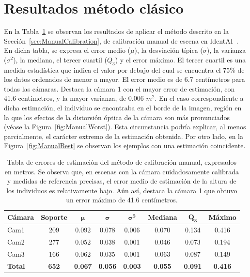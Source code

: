 \section{Resultados método clásico}
En la Tabla~\ref{tab:ManualResults} se observan los resultados de
aplicar el método descrito en la Sección~\ref{sec:ManualCalibration},
de calibración manual de escena en IdentAI~\cite{panacea2026}.
En dicha tabla, se expresa el error medio ($\mu$), la desviación típica ($\sigma$), la varianza ($\sigma^2$), la mediana,
el tercer cuartil ($Q_3$) y el error máximo. El tercer cuartil es una medida estadística que indica el valor
por debajo del cual se encuentra el 75\% de los datos ordenados de menor a mayor.
El error medio es de 6.7 centímetros para todas las cámaras.
Destaca la cámara 1 con el mayor error de estimación, con 41.6 centímetros,
y la mayor varianza, de 0.006 $m^2$. En el caso correspondiente a dicha estimación,
el individuo se encontraba en el borde de la imagen, región en la que los efectos
de la distorsión óptica de la cámara son más pronunciados (véase la Figura~\ref{fig:ManualWorst}).
Esta circunstancia podría explicar, al menos parcialmente, el carácter extremo de la estimación obtenida.
Por otro lado, en la Figura~\ref{fig:ManualBest} se observan los ejemplos
con una estimación coincidente.
\begin{table}[!ht]
  \centering
  \scriptsize
\begin{tabular}{|l|c|c|c|c|c|c|c|}
\hline
\rowcolor[HTML]{FFCB2F}
\textbf{Cámara} & \textbf{Soporte} & $\bm{\mu}$ & $\bm{\sigma}$ & $\bm{\sigma^2}$ & \textbf{Mediana} & $\bm{Q_3}$ & \textbf{Máximo} \\
\hline
Cam1 & 209 & 0.092 & 0.078 & 0.006 &0.070 & 0.134 & 0.416 \\
\hline
Cam2 & 277 & 0.052 & 0.038 & 0.001 &0.046 & 0.073 & 0.194 \\
\hline
Cam3 & 166 & 0.062 & 0.035 & 0.001 &0.063 & 0.087 & 0.149 \\
\hline
\textbf{Total} & \textbf{652} & \textbf{0.067} & \textbf{0.056} & \textbf{0.003} & \textbf{0.055} & \textbf{0.091} & \textbf{0.416} \\
\hline
\end{tabular}
\caption[Tabla de errores de estimación del método de calibración manual, expresados en metros.]{
 Tabla de errores de estimación del método de calibración manual, expresados en metros.
 Se observa que, en escenas con la cámara cuidadosamente calibrada y medidas de referencia precisas, el error medio de estimación de la altura de los
 individuos es relativamente bajo. Aún así, destaca la cámara 1 que obtuvo un error máximo de 41.6 centímetros.
}
\label{tab:ManualResults}
\end{table}

